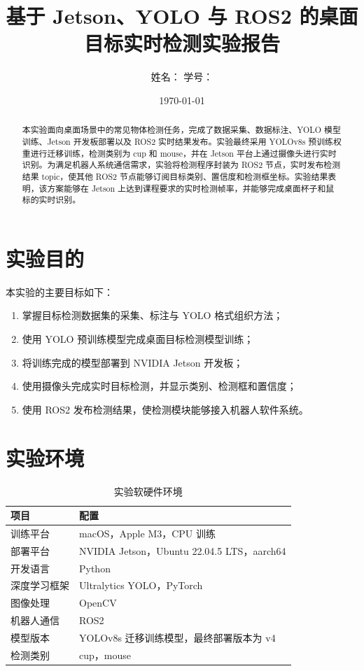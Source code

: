 \documentclass[UTF8,a4paper,12pt,fontset=fandol]{ctexart}
\title{基于 Jetson、YOLO 与 ROS2 的桌面目标实时检测实验报告}
\author{姓名：\underline{\hspace{4cm}} \quad 学号：\underline{\hspace{4cm}}}
\date{\today}
\begin{document}
\maketitle

\begin{abstract}
本实验面向桌面场景中的常见物体检测任务，完成了数据采集、数据标注、YOLO 模型训练、Jetson 开发板部署以及 ROS2 实时结果发布。实验最终采用 YOLOv8s 预训练权重进行迁移训练，检测类别为 cup 和 mouse，并在 Jetson 平台上通过摄像头进行实时识别。为满足机器人系统通信需求，实验将检测程序封装为 ROS2 节点，实时发布检测结果 topic，使其他 ROS2 节点能够订阅目标类别、置信度和检测框坐标。实验结果表明，该方案能够在 Jetson 上达到课程要求的实时检测帧率，并能够完成桌面杯子和鼠标的实时识别。
\end{abstract}

\section{实验目的}

本实验的主要目标如下：

\begin{enumerate}
  \item 掌握目标检测数据集的采集、标注与 YOLO 格式组织方法；
  \item 使用 YOLO 预训练模型完成桌面目标检测模型训练；
  \item 将训练完成的模型部署到 NVIDIA Jetson 开发板；
  \item 使用摄像头完成实时目标检测，并显示类别、检测框和置信度；
  \item 使用 ROS2 发布检测结果，使检测模块能够接入机器人软件系统。
\end{enumerate}

\section{实验环境}

\begin{table}[H]
\centering
\begin{tabular}{>{\raggedright\arraybackslash}p{4cm}p{9cm}}
\toprule
项目 & 配置 \\
\midrule
训练平台 & macOS，Apple M3，CPU 训练 \\
部署平台 & NVIDIA Jetson，Ubuntu 22.04.5 LTS，aarch64 \\
开发语言 & Python \\
深度学习框架 & Ultralytics YOLO，PyTorch \\
图像处理 & OpenCV \\
机器人通信 & ROS2 \\
模型版本 & YOLOv8s 迁移训练模型，最终部署版本为 v4 \\
检测类别 & cup，mouse \\
\bottomrule
\end{tabular}
\caption{实验软硬件环境}
\end{table}
\end{document}
